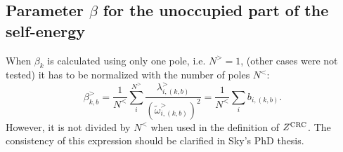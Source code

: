 \documentclass[a4paper,12pt]{article}
\begin{document}
\subsection{Parameter $\beta$ for the unoccupied part of the self-energy}

When $\beta_k$ is calculated using only one pole, i.e. $N^>=1$, (other cases were not tested) it has to be normalized with the number of poles $N^<$: 
\begin{equation}
	\beta_{k,b}^>  = \frac1{N^<} \sum_i^{N^>} \frac{\lambda_{i,(k,b)}^>}{(\tilde\omega_{i,(k,b)}^>)^2} = \frac1{N^<} \sum_i b_{i,(k,b)}.
\end{equation}
However, it is not divided by $N^<$ when used in the definition of $Z^\textnormal{CRC}$. 
The consistency of this expression should be clarified in Sky's PhD thesis. 
\end{document}
